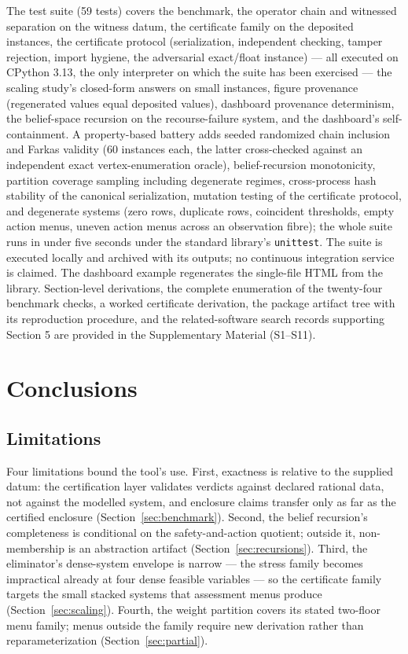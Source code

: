 \documentclass[11pt]{article}
\begin{document}
The test suite (59 tests) covers the benchmark, the operator chain and
witnessed separation on the witness datum, the certificate family on the
deposited instances, the certificate protocol (serialization, independent
checking, tamper rejection, import hygiene, the adversarial exact/float
instance) --- all executed on CPython 3.13, the only interpreter on which
the suite has been exercised --- the scaling study's closed-form answers
on small instances,
figure provenance (regenerated values equal deposited values), dashboard
provenance determinism, the belief-space recursion on the recourse-failure
system, and the dashboard's self-containment. A property-based battery
adds seeded randomized chain inclusion and Farkas validity (60 instances
each, the latter cross-checked against an independent exact
vertex-enumeration oracle), belief-recursion monotonicity, partition
coverage sampling including degenerate regimes, cross-process hash
stability of the canonical serialization, mutation testing of the
certificate protocol, and degenerate systems (zero rows, duplicate rows,
coincident thresholds, empty action menus, uneven action menus across an
observation fibre); the whole suite runs in under five seconds under the standard library's \texttt{unittest}. The suite
is executed locally and archived with its outputs; no continuous
integration service is claimed.
The dashboard example regenerates the single-file HTML from the library.
Section-level derivations, the complete enumeration of the twenty-four
benchmark checks, a worked certificate derivation, the package artifact
tree with its reproduction procedure, and the related-software search
records supporting Section 5 are provided in the Supplementary Material
(S1--S11).

\section{Conclusions}\label{sec:conclusions}

\subsection{Limitations}

Four limitations bound the tool's use. First, exactness is relative to
the supplied datum: the certification layer validates verdicts against
declared rational data, not against the modelled system, and enclosure
claims transfer only as far as the certified enclosure
(Section~\ref{sec:benchmark}). Second, the belief recursion's
completeness is conditional on the safety-and-action quotient; outside
it, non-membership is an abstraction artifact
(Section~\ref{sec:recursions}). Third, the eliminator's dense-system
envelope is narrow --- the stress family becomes impractical already at
four dense feasible variables --- so the certificate family targets the
small stacked systems that assessment menus produce
(Section~\ref{sec:scaling}). Fourth, the weight partition covers its
stated two-floor menu family; menus outside the family require new
derivation rather than reparameterization (Section~\ref{sec:partial}).
\end{document}
